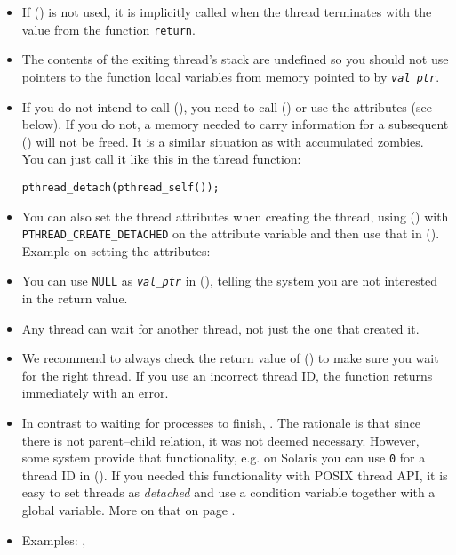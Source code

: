 \begin{itemize}
\item If () is not used, it is implicitly called when the
thread terminates with the value from the function \texttt{return}.
\item The contents of the exiting thread's stack are undefined so you should
not use pointers to the function local variables from memory pointed to by
\emph{\texttt{val\_ptr}}.
\item If you do not intend to call (), you need to call
() or use the attributes (see below).  If you do not, a
memory needed to carry information for a subsequent () will
not be freed.  It is a similar situation as with accumulated zombies.  You can
just call it like this in the thread function:
\begin{alltt}
pthread\_detach(pthread\_self());
\end{alltt}
\item You can also set the thread attributes when creating the thread, using
() with
\texttt{PTHREAD\_CREATE\_DETACHED} on the attribute variable and then use that
in ().  Example on setting the attributes:
\item You can use \texttt{NULL} as \emph{\texttt{val\_ptr}} in
(), telling the system you are not interested in the return
value.
\item Any thread can wait for another thread, not just the one that created it.
\item We recommend to always check the return value of ()
to make sure you wait for the right thread.  If you use an incorrect thread ID,
the function returns immediately with an error.
\item In contrast to waiting for processes to finish, .  The rationale is that since there is not parent--child
relation, it was not deemed necessary.  However, some system provide that
functionality, e.g.  on Solaris you can use \texttt{0} for a thread ID in
().  If you needed this functionality with POSIX thread API, it
is easy to set threads as \emph{detached} and use a condition variable together
with a global variable.  More on that on page \pageref{CONDITION_VARIABLES}.
\item \label{PTHREAD_JOIN} Examples: ,
\end{itemize}


